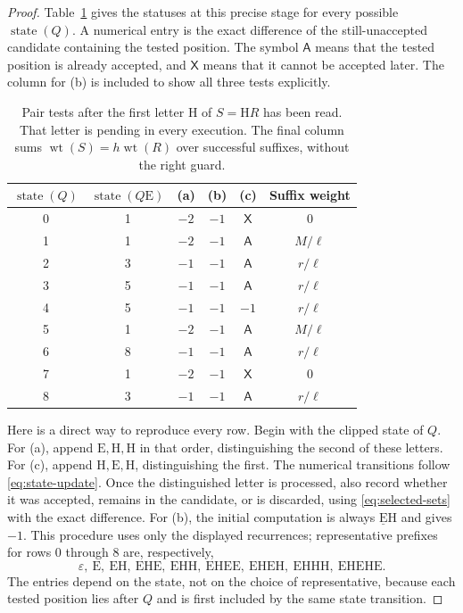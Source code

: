 \documentclass[11pt,a4paper]{article}
\theoremstyle{definition}
\theoremstyle{remark}
\newcommand{\wt}{\operatorname{wt}}
\newcommand{\E}{\mathrm E}
\newcommand{\HH}{\mathrm H}
\DeclareMathOperator{\state}{state}
\begin{document}
\begin{proof}
Table~\ref{tab:pair-states} gives the statuses at this precise stage for every possible $\state(Q)$. A numerical entry is the exact difference of the still-unaccepted candidate containing the tested position. The symbol $\mathsf A$ means that the tested position is already accepted, and $\mathsf X$ means that it cannot be accepted later. The column for (b) is included to show all three tests explicitly.
\begin{table}[htbp]
\centering
\caption{Pair tests after the first letter $\HH$ of $S=\HH R$ has been read. That letter is pending in every execution. The final column sums $\wt(S)=h\wt(R)$ over successful suffixes, without the right guard.}\label{tab:pair-states}
\begin{tabular}{cccccc}
\toprule
$\state(Q)$&$\state(Q\E)$&(a)&(b)&(c)&Suffix weight\\
\midrule
0&1&$-2$&$-1$&$\mathsf X$&$0$\\
1&1&$-2$&$-1$&$\mathsf A$&$M/\ell$\\
2&3&$-1$&$-1$&$\mathsf A$&$r/\ell$\\
3&5&$-1$&$-1$&$\mathsf A$&$r/\ell$\\
4&5&$-1$&$-1$&$-1$&$r/\ell$\\
5&1&$-2$&$-1$&$\mathsf A$&$M/\ell$\\
6&8&$-1$&$-1$&$\mathsf A$&$r/\ell$\\
7&1&$-2$&$-1$&$\mathsf X$&$0$\\
8&3&$-1$&$-1$&$\mathsf A$&$r/\ell$\\
\bottomrule
\end{tabular}
\end{table}

Here is a direct way to reproduce every row. Begin with the clipped state of $Q$. For (a), append $\E,\HH,\HH$ in that order, distinguishing the second of these letters. For (c), append $\HH,\E,\HH$, distinguishing the first. The numerical transitions follow \eqref{eq:state-update}. Once the distinguished letter is processed, also record whether it was accepted, remains in the candidate, or is discarded, using \eqref{eq:selected-sets} with the exact difference. For (b), the initial computation is always $\underline{\E}\HH$ and gives $-1$. This procedure uses only the displayed recurrences; representative prefixes for rows 0 through 8 are, respectively,
\[
\varepsilon,\ \E,\ \E\HH,\ \E\HH\E,\ \E\HH\HH,
\ \E\HH\E\E,\ \E\HH\E\HH,\ \E\HH\HH\HH,\ \E\HH\E\HH\E.
\]
The entries depend on the state, not on the choice of representative, because each tested position lies after $Q$ and is first included by the same state transition.


\end{proof}
\end{document}
